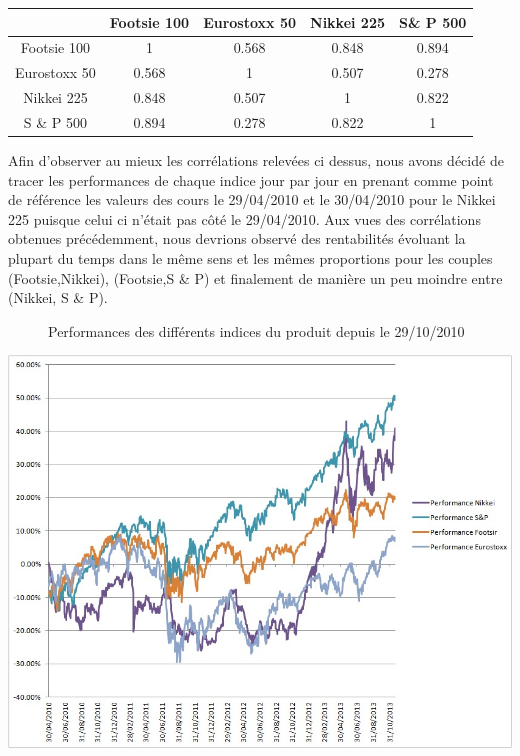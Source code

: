 \documentclass[french,12pt,a4paper]{article}
\begin{document}
\begin{spacing}{1.2}
\begin{center}
\begin{tabular}{|c|c|c|c|c|}
  \hline
   & Footsie 100 & Eurostoxx 50 & Nikkei 225 & S\& P 500 \\
  \hline
  Footsie 100 & 1 & 0.568 & 0.848 & 0.894\\
  Eurostoxx 50 & 0.568 & 1 & 0.507 & 0.278 \\
  Nikkei 225 & 0.848 & 0.507 & 1 & 0.822\\
  S \& P 500 & 0.894 & 0.278 & 0.822 & 1\\
  \hline
\end{tabular}
\end{center}
\end{spacing}

Afin d'observer au mieux les corrélations relevées ci dessus, nous avons décidé de tracer les performances de chaque indice jour par jour en prenant comme point de référence les valeurs des cours le 29/04/2010 et le 30/04/2010 pour le Nikkei 225 puisque celui ci n'était pas côté le 29/04/2010.
Aux vues des corrélations obtenues précédemment, nous devrions observé des rentabilités évoluant la plupart du temps dans le même sens et les mêmes proportions pour les couples (Footsie,Nikkei), (Footsie,S \& P) et finalement de manière un peu moindre entre (Nikkei, S \& P).


\begin{center}
\begin{figure}[h!]
\caption{Performances des différents indices du produit depuis le 29/10/2010}
\end{figure}
\end{center}


\begin{center}
\includegraphics[scale=0.5]{Correlations_indices.jpg}
\end{center}
\end{document}
